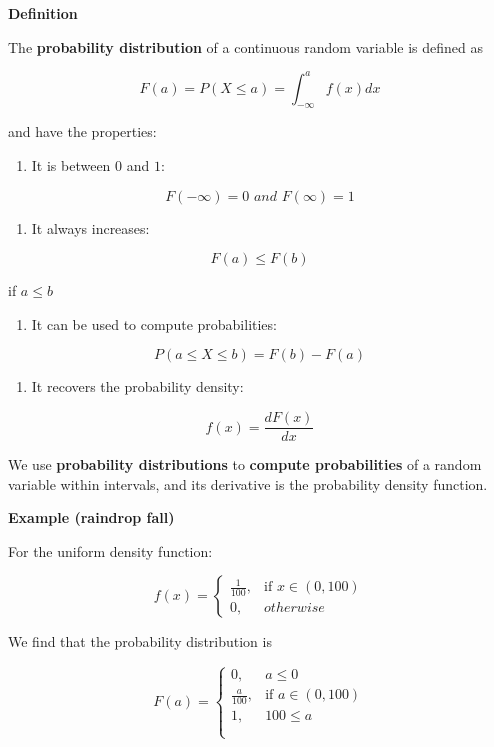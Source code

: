\documentclass[
]{book}
\providecommand{\tightlist}{%
  \setlength{\itemsep}{0pt}\setlength{\parskip}{0pt}}
\begin{document}
\textbf{Definition}

The \textbf{probability distribution} of a continuous random variable is defined as

\[F(a)=P(X\leq a) =\int_{-\infty} ^a f(x)dx\]

and have the properties:

\begin{enumerate}
\def\labelenumi{\arabic{enumi})}
\tightlist
\item
  It is between \(0\) and \(1\):
\end{enumerate}

\[F(-\infty)= 0 \,\, and \,\,F(\infty)=1\]

\begin{enumerate}
\def\labelenumi{\arabic{enumi})}
\setcounter{enumi}{1}
\tightlist
\item
  It always increases:
\end{enumerate}

\[F(a)\leq F(b)\]

if \(a\leq b\)

\begin{enumerate}
\def\labelenumi{\arabic{enumi})}
\setcounter{enumi}{2}
\tightlist
\item
  It can be used to compute probabilities:
\end{enumerate}

\[P(a \leq X \leq b)=F(b)-F(a)\]

\begin{enumerate}
\def\labelenumi{\arabic{enumi})}
\setcounter{enumi}{3}
\tightlist
\item
  It recovers the probability density:
\end{enumerate}

\[f(x)=\frac{dF(x)}{dx}\]

We use \textbf{probability distributions} to \textbf{compute probabilities} of a random variable within intervals, and its derivative is the probability density function.

\textbf{Example (raindrop fall)}

For the uniform density function:

\[
    f(x)= 
\begin{cases}
    \frac{1}{100},& \text{if } x\in (0,100)\\
    0,& otherwise 
\end{cases}
\]

We find that the probability distribution is

\[
    F(a)= 
\begin{cases}
    0,& a \leq 0 \\
    \frac{a}{100},& \text{if } a\in (0,100)\\
    1, & 100 \leq a \\
    \\
\end{cases}
\]
\end{document}

